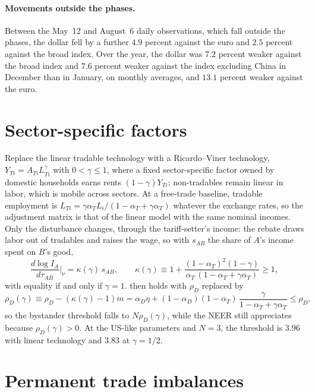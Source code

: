 \documentclass[11pt]{article}
\numberwithin{equation}{section}
\theoremstyle{plain}
\begin{document}
\paragraph{Movements outside the phases.} Between the May~12 and August~6 daily observations, which fall outside the phases, the dollar fell by a further $4.9$ percent against the euro and $2.5$ percent against the broad index. Over the year, the dollar was $7.2$ percent weaker against the broad index and $7.6$ percent weaker against the index excluding China in December than in January, on monthly averages, and $13.1$ percent weaker against the euro.

\section{Sector-specific factors}

Replace the linear tradable technology with a Ricardo--Viner technology, $Y_{Ti}=A_{Ti}L_{Ti}^{\gamma}$ with $0<\gamma\leq1$, where a fixed sector-specific factor owned by domestic households earns rents $(1-\gamma)Y_{Ti}$; non-tradables remain linear in labor, which is mobile across sectors. At a free-trade baseline, tradable employment is $L_{Ti}=\gamma\alpha_TL_i/(1-\alpha_T+\gamma\alpha_T)$ whatever the exchange rates, so the adjustment matrix is that of the linear model with the same nominal incomes. Only the disturbance changes, through the tariff-setter's income: the rebate draws labor out of tradables and raises the wage, so with $s_{AB}$ the share of $A$'s income spent on $B$'s good,
\begin{equation*}
\frac{d\log I_A}{d\tau_{AB}}\bigg|_{\nu}=\kappa(\gamma)\,s_{AB},\qquad
\kappa(\gamma)\equiv1+\frac{(1-\alpha_T)^2(1-\gamma)}{\alpha_T\,(1-\alpha_T+\gamma\alpha_T)}\geq1,
\end{equation*}
with equality if and only if $\gamma=1$.  then holds with $\rho_D$ replaced by
\begin{equation*}
\rho_D(\gamma)\equiv\rho_D-(\kappa(\gamma)-1)m=\alpha_D\eta+(1-\alpha_D)(1-\alpha_T)\,\frac{\gamma}{1-\alpha_T+\gamma\alpha_T}\leq\rho_D,
\end{equation*}
so the bystander threshold falls to $N\rho_D(\gamma)$, while the NEER still appreciates because $\rho_D(\gamma)>0$. At the US-like parameters and $N=3$, the threshold is $3.96$ with linear technology and $3.83$ at $\gamma=1/2$.

\section{Permanent trade imbalances}
\end{document}
